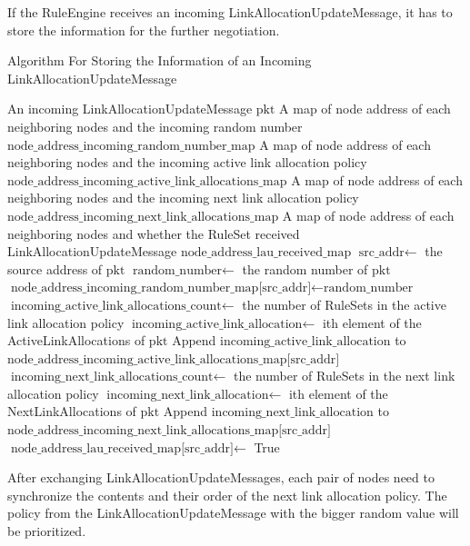 If the RuleEngine receives an incoming LinkAllocationUpdateMessage, it has to store the information for the further negotiation.
\begin{algorithm}[H]  
  \caption{Algorithm For Storing the Information of an Incoming LinkAllocationUpdateMessage}                 
  \begin{algorithmic}[1]
    \Require An incoming LinkAllocationUpdateMessage $\text{pkt}$
    \Require  A map of node address of each neighboring nodes and the incoming random number $\text{node\_address\_incoming\_random\_number\_map}$
    \Require  A map of node address of each neighboring nodes and the incoming active link allocation policy $\text{node\_address\_incoming\_active\_link\_allocations\_map}$
    \Require  A map of node address of each neighboring nodes and the incoming next link allocation policy $\text{node\_address\_incoming\_next\_link\_allocations\_map}$
    \Require  A map of node address of each neighboring nodes and whether the RuleSet received LinkAllocationUpdateMessage $\text{node\_address\_lau\_received\_map}$
    \State $\text{src\_addr} \gets$ the source address of $\text{pkt}$
    \State $\text{random\_number} \gets$ the random number of $\text{pkt}$
    \State $\text{node\_address\_incoming\_random\_number\_map[src\_addr]} \gets \text{random\_number}$
    \State $\text{incoming\_active\_link\_allocations\_count} \gets$ the number of RuleSets in the active link allocation policy
      \State $\text{incoming\_active\_link\_allocation} \gets$ ith element of the ActiveLinkAllocations of $\text{pkt}$
      \State Append $\text{incoming\_active\_link\_allocation}$ to $\text{node\_address\_incoming\_active\_link\_allocations\_map[src\_addr]}$
    \EndFor
    \State $\text{incoming\_next\_link\_allocations\_count} \gets$ the number of RuleSets in the next link allocation policy
      \State $\text{incoming\_next\_link\_allocation} \gets$ ith element of the NextLinkAllocations of $\text{pkt}$
      \State Append $\text{incoming\_next\_link\_allocation}$ to $\text{node\_address\_incoming\_next\_link\_allocations\_map[src\_addr]}$
    \EndFor
    \State $\text{node\_address\_lau\_received\_map[src\_addr]} \gets$ True
  \end{algorithmic}
\end{algorithm}

After exchanging LinkAllocationUpdateMessages, each pair of nodes need to synchronize the contents and their order of the next link allocation policy.
The policy from the LinkAllocationUpdateMessage with the bigger random value will be prioritized.


